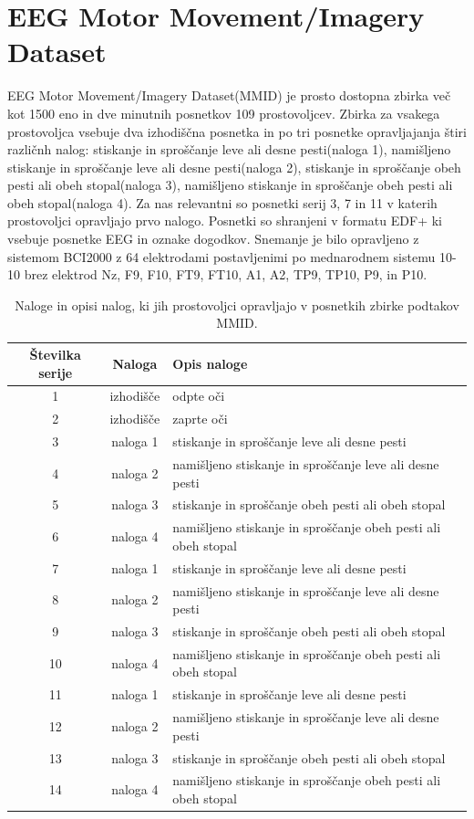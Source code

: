 \section{EEG Motor Movement/Imagery Dataset}
EEG Motor Movement/Imagery Dataset(MMID) je prosto dostopna zbirka več kot 1500 eno in dve minutnih posnetkov 109 prostovoljcev. Zbirka za vsakega prostovoljca vsebuje dva izhodiščna posnetka in po tri posnetke opravljajanja štiri različnh nalog: stiskanje in sproščanje leve ali desne pesti(naloga 1), namišljeno stiskanje in sproščanje leve ali desne pesti(naloga 2), stiskanje in sproščanje obeh pesti ali obeh stopal(naloga 3), namišljeno stiskanje in sproščanje obeh pesti ali obeh stopal(naloga 4). Za nas relevantni so posnetki serij 3, 7 in 11 v katerih prostovoljci opravljajo prvo nalogo. Posnetki so shranjeni v formatu EDF+ ki vsebuje posnetke EEG in oznake dogodkov. Snemanje je bilo opravljeno z sistemom BCI2000 z 64 elektrodami postavljenimi po mednarodnem sistemu 10-10 brez elektrod Nz, F9, F10, FT9, FT10, A1, A2, TP9, TP10, P9, in P10.\cite{schalkBCI2000GeneralpurposeBraincomputer2004,schalkEEGMotorMovement2009}

\begin{table}[h]
\centering
\begin{tabular}{|c|c|l|}

\hline
Številka serije & Naloga &Opis naloge \\
\hline
1 & izhodišče & odpte oči  \\
\hline
2 & izhodišče & zaprte oči  \\
\hline
3 & naloga 1 & stiskanje in sproščanje leve ali desne pesti \\
\hline
4 & naloga 2 &namišljeno stiskanje in sproščanje leve ali desne pesti  \\
\hline
5 & naloga 3 &stiskanje in sproščanje obeh pesti ali obeh stopal \\
\hline
6 & naloga 4 &namišljeno stiskanje in sproščanje obeh pesti ali obeh stopal  \\
\hline
7 & naloga 1 &stiskanje in sproščanje leve ali desne pesti \\
\hline
8 & naloga 2 &namišljeno stiskanje in sproščanje leve ali desne pesti  \\
\hline
9 & naloga 3 &stiskanje in sproščanje obeh pesti ali obeh stopal \\
\hline
10 & naloga 4 &namišljeno stiskanje in sproščanje obeh pesti ali obeh stopal  \\
\hline
11 & naloga 1 &stiskanje in sproščanje leve ali desne pesti \\
\hline
12 &naloga 2 &namišljeno stiskanje in sproščanje leve ali desne pesti  \\
\hline
13 & naloga 3 &stiskanje in sproščanje obeh pesti ali obeh stopal \\
\hline
14 & naloga 4 &namišljeno stiskanje in sproščanje obeh pesti ali obeh stopal  \\

\hline
\end{tabular}
\caption{Naloge in opisi nalog, ki jih prostovoljci opravljajo v posnetkih zbirke podtakov MMID.}
\end{table}

